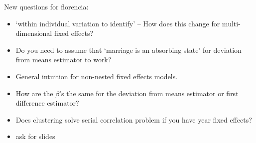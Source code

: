 \documentclass[12 pt, leqno]{article}
\begin{document}
New questions for florencia:
\begin{itemize}
\item `within individual variation to identify' -- How does this change for multi-dimensional fixed effects?
\item Do you need to assume that `marriage is an absorbing state' for deviation from means estimator to work?
\item General intuition for non-nested fixed effects models. 
\item How are the $\beta$'s the same for the deviation from means estimator or first difference estimator?
\item Does clustering solve serial correlation problem if you have year fixed effects?
\item ask for slides
\end{itemize}
\end{document}
